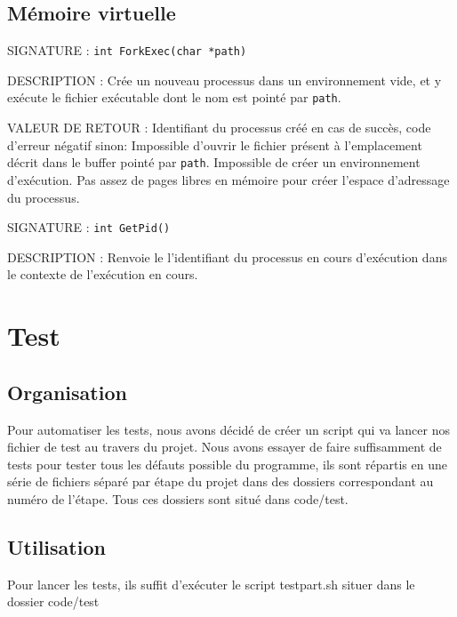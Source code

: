 \documentclass{article}
\begin{document}
	\subsection{Mémoire virtuelle}
		\begin{description}
			\item{SIGNATURE : } \texttt{int ForkExec(char *path)}
			\item{DESCRIPTION : } Crée un nouveau processus dans un environnement vide, et y exécute le fichier exécutable dont le nom est pointé par \texttt{path}.
			\item{VALEUR DE RETOUR : } Identifiant du processus créé en cas de succès, code d'erreur négatif sinon:
				 Impossible d'ouvrir le fichier présent à l'emplacement décrit dans le buffer pointé par \texttt{path}.
				 Impossible de créer un environnement d'exécution.
				 Pas assez de pages libres en mémoire pour créer l'espace d'adressage du processus.
		\end{description}
		\vspace{2.5mm}
		\begin{description}
			\item{SIGNATURE : } \texttt{int GetPid()}
			\item{DESCRIPTION : Renvoie le l'identifiant du processus en cours d'exécution dans le contexte de l'exécution en cours. } 
		\end{description}

\section{Test}
	\subsection{Organisation}
		{Pour automatiser les tests, nous avons décidé de créer un script qui va lancer nos fichier de test au travers du projet.
		Nous avons essayer de faire suffisamment de tests pour tester tous les défauts possible du programme, ils sont répartis en une série de fichiers séparé par étape du projet dans des dossiers correspondant au numéro de l'étape. Tous ces dossiers sont situé dans code/test.}

	\subsection{Utilisation}
		{Pour lancer les tests, ils suffit d'exécuter le script testpart.sh situer dans le dossier code/test}
\end{document}
